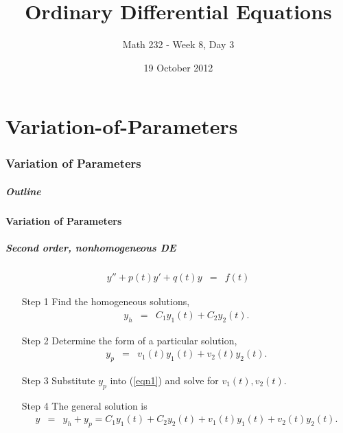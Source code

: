 \part{Variation-of-Parameters}
\section{Variation of Parameters}

\title{Ordinary Differential Equations}
\subtitle{Math 232 - Week 8, Day 3}
\date{19 October 2012}

\begin{frame}
  \titlepage
\end{frame}

\begin{frame}
  \frametitle{Outline}
\end{frame}


\subsection{Variation of Parameters}


\begin{frame}
  \frametitle{Second order, nonhomogeneous DE}
  \vspace{-1cm}
  \begin{eqnarray}\label{eqn1}
    y'' + p(t) y' + q(t) y & = & f(t)
  \end{eqnarray}

  \begin{itemize}
  \item[Step 1] Find the homogeneous solutions,
    \begin{eqnarray*}
      y_h & = & C_1 y_1(t) + C_2 y_2(t).
    \end{eqnarray*}
  \item[Step 2] Determine the form of a particular solution,
    \begin{eqnarray*}
      y_p & = & v_1(t) y_1(t) + v_2(t) y_2(t).
    \end{eqnarray*}
  \item[Step 3] Substitute $y_p$ into (\ref{eqn1}) and solve 
for $v_1(t), v_2(t)$.
  \item[Step 4] The general solution is 
    \begin{eqnarray*}
      y & = & y_h+y_p= C_1 y_1(t) + C_2 y_2(t) + v_1(t) y_1(t) + v_2(t) y_2(t).
    \end{eqnarray*}

  \end{itemize}

\end{frame}



